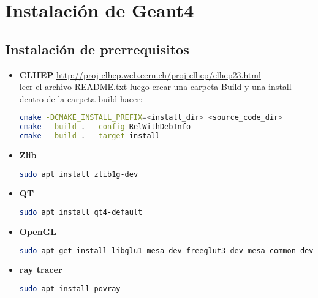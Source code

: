 \section{Instalación de Geant4}
\subsection{Instalación de prerrequisitos}

\begin{itemize}
    \item \textbf{CLHEP}
    \url{http://proj-clhep.web.cern.ch/proj-clhep/clhep23.html} \\
leer el archivo README.txt luego crear una carpeta Build y una install dentro de la carpeta build hacer:

\begin{lstlisting}[language=bash,style=mystyle]
cmake -DCMAKE_INSTALL_PREFIX=<install_dir> <source_code_dir>
cmake --build . --config RelWithDebInfo
cmake --build . --target install
\end{lstlisting} 




    \item \textbf{Zlib}%
    
\begin{lstlisting}[language=bash,style=mystyle]
sudo apt install zlib1g-dev 
\end{lstlisting}     
    
    
    \item \textbf{QT}%
    
\begin{lstlisting}[language=bash,style=mystyle]
sudo apt install qt4-default
\end{lstlisting}      
    
    
    \item \textbf{OpenGL}%
    
\begin{lstlisting}[language=bash,style=mystyle]
sudo apt-get install libglu1-mesa-dev freeglut3-dev mesa-common-dev
\end{lstlisting}      
    
    
    \item \textbf{ray tracer}%
    
\begin{lstlisting}[language=bash,style=mystyle]
sudo apt install povray
\end{lstlisting}     
    

\end{itemize}
